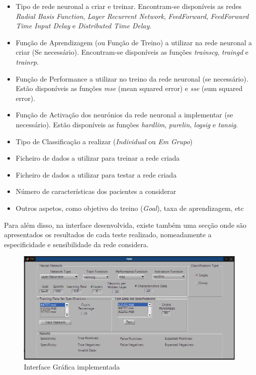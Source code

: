 \documentclass{article}
\begin{document}
\begin{itemize}
\item Tipo de rede neuronal a criar e treinar. Encontram-se disponíveis as redes \emph{Radial Basis Function}, \emph{Layer Recurrent Network}, \emph{FeedForward}, \emph{FeedForward Time Input Delay} e \emph{Distributed Time Delay}.

\item Função de Aprendizagem (ou Função de Treino) a utilizar na rede neuronal a criar (Se necessário). Encontram-se disponíveis as funções \emph{trainscg}, \emph{traingd} e \emph{trainrp}.

\item Função de Performance a utilizar no treino da rede neuronal (se necessário). Estão disponíveis as funções \emph{mse} (mean squared error) e \emph{sse} (sum squared error).

\item Função de Activação dos neurónios da rede neuronal a implementar (se necessário). Estão disponíveis as funções \emph{hardlim}, \emph{purelin}, \emph{logsig} e \emph{tansig}.

\item Tipo de Classificação a realizar (\emph{Individual} ou \emph{Em Grupo})

\item Ficheiro de dados a utilizar para treinar a rede criada

\item Ficheiro de dados a utilizar para testar a rede criada

\item Número de características dos pacientes a considerar

\item Outros aspetos, como objetivo do treino (\emph{Goal}), taxa de aprendizagem, etc
\end{itemize}

Para além disso, na interface desenvolvida, existe também uma secção onde são apresentados os resultados de cada teste realizado, nomeadamente a especificidade e sensibilidade da rede considera.

\begin{figure}[H]
  \centering
      \includegraphics[scale=0.3]{Images/Aplication_GUI.png}
  \caption{Interface Gráfica implementada}
\end{figure}
\end{document}
